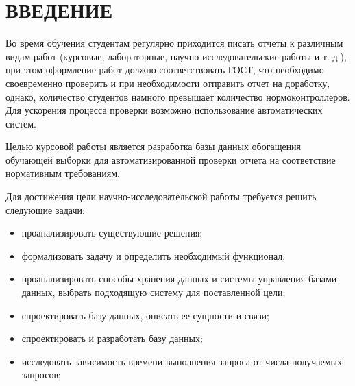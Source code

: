 \chapter*{ВВЕДЕНИЕ}

Во время обучения студентам регулярно приходится писать отчеты к различным видам работ (курсовые, лабораторные, научно-исследовательские работы и т. д.), при этом оформление работ должно соответствовать ГОСТ, что необходимо своевременно проверить и при необходимости отправить отчет на доработку, однако, количество студентов намного превышает количество нормоконтроллеров. Для ускорения процесса проверки возможно использование автоматических систем.

Целью курсовой работы является разработка базы данных обогащения обучающей выборки для автоматизированной проверки отчета на соответствие нормативным требованиям.

Для достижения цели научно-исследовательской работы требуется решить следующие задачи:
\begin{itemize}
	\item проанализировать существующие решения;
	\item формализовать задачу и определить необходимый функционал;
	\item проанализировать способы хранения данных и системы управления базами данных, выбрать подходящую систему для поставленной цели;
	\item спроектировать базу данных, описать ее сущности и связи;
	\item спроектировать и разработать базу данных;
	\item исследовать зависимость времени выполнения запроса от числа получаемых запросов;
\end{itemize}